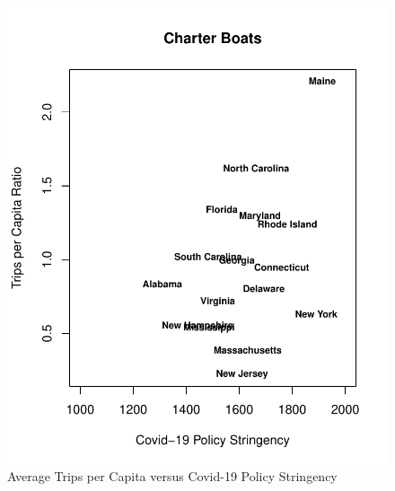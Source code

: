 \documentclass[10pt,letterpaper]{article}
\begin{document}
\begin{figure}

{\centering \includegraphics{C19PolicyRec_files/figure-latex/tripsVstring-2} 

}

\caption{Average Trips per Capita versus Covid-19 Policy Stringency}\label{fig:tripsVstring-2}
\end{figure}
\end{document}
